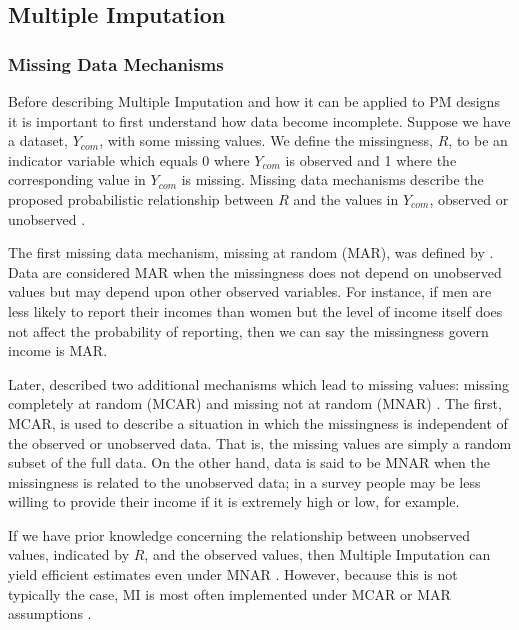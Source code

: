 \documentclass{svjour3}\usepackage[]{graphicx}\usepackage[]{color}
\begin{document}
\subsection{Multiple Imputation}
\label{sec:1.3}
\subsubsection{Missing Data Mechanisms}
\label{sec:1.3.1}
Before describing Multiple Imputation and how it can be applied to PM designs it is important to first understand how data become incomplete. Suppose we have a dataset, $Y_{com}$, with some missing values. We define the missingness, $R$, to be an indicator variable which equals 0 where $Y_{com}$ is observed and 1 where the corresponding value in $Y_{com}$ is missing. Missing data mechanisms describe the proposed probabilistic relationship between $R$ and the values in $Y_{com}$, observed or unobserved \citep{little2014statistical}. \par

The first missing data mechanism, missing at random (MAR), was defined by \citet{rubin1976inference}. Data are considered MAR when the missingness does not depend on unobserved values but may depend upon other observed variables. For instance, if men are less likely to report their incomes than women but the level of income itself does not affect the probability of reporting, then we can say the missingness govern income is MAR. \par

Later, \citet{little2014statistical} described two additional mechanisms which lead to missing values: missing completely at random (MCAR) and missing not at random (MNAR) \citep{little2014statistical}. The first, MCAR, is used to describe a situation in which the missingness is independent of the observed or unobserved data. That is, the missing values are simply a random subset of the full data. On the other hand, data is said to be MNAR when the missingness is related to the unobserved data; in a survey people may be less willing to provide their income if it is extremely high or low, for example. \par

If we have prior knowledge concerning the relationship between unobserved values, indicated by $R$, and the observed values, then Multiple Imputation can yield efficient estimates even under MNAR \citep{harel2007multiple}. However, because this is not typically the case, MI is most often implemented under MCAR or MAR assumptions \citep{little2014statistical}. \par
\end{document}
